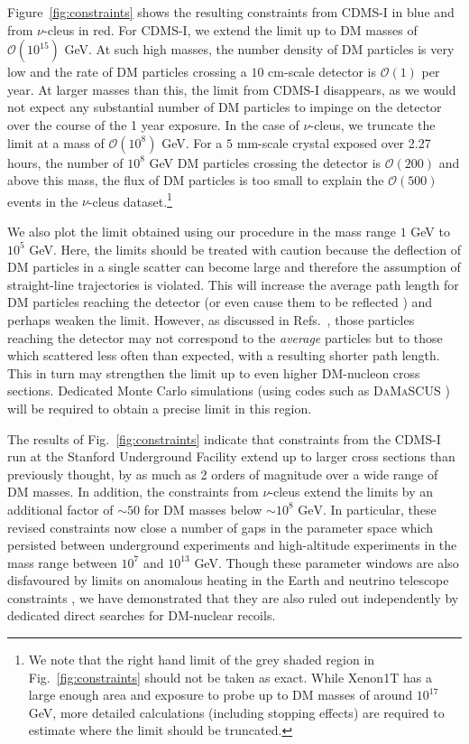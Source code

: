 \documentclass[prd,twocolumn,showpacs,nofootinbib,aps]{revtex4-1}
\begin{document}
Figure~\ref{fig:constraints} shows the resulting constraints from CDMS-I in blue and from $\nu$-cleus in red.  For CDMS-I, we extend the limit up to DM masses of $\mathcal{O}(10^{15})$ GeV. At such high masses, the number density of DM particles is very low and the rate of DM particles crossing a $10 \,\,\mathrm{cm}$-scale detector is $\mathcal{O}(1)$ per year. At larger masses than this, the limit from CDMS-I disappears, as we would not expect any substantial number of DM particles to impinge on the detector over the course of the 1 year exposure. In the case of $\nu$-cleus, we truncate the limit at a mass of $\mathcal{O}(10^{8})$ GeV. For a $5 \,\,\mathrm{mm}$-scale crystal exposed over 2.27 hours, the number of $10^{8}$ GeV DM particles crossing the detector is $\mathcal{O}(200)$ and above this mass, the flux of DM particles is too small to explain the $\mathcal{O}(500)$ events in the $\nu$-cleus dataset.\footnote{We note that the right hand limit of the grey shaded region in Fig.~\ref{fig:constraints} should not be taken as exact. While Xenon1T has a large enough area and exposure to probe up to DM masses  of around $10^{17}$ GeV, more detailed calculations (including stopping effects) are required to estimate where the limit should be truncated.}

We also plot the limit obtained using our procedure in the mass range $1$ GeV to $10^5$ GeV. Here, the limits should be treated with caution because the deflection of DM particles in a single scatter can become large and therefore the assumption of straight-line trajectories is violated. This will increase the average path length for DM particles reaching the detector (or even cause them to be reflected \cite{Kavanagh:2016pyr}) and perhaps weaken the limit. However, as discussed in Refs.~\cite{Mahdawi:2017cxz,Mahdawi:2017utm}, those particles reaching the detector may not correspond to the \textit{average} particles but to those which scattered less often than expected, with a resulting shorter path length. This in turn may strengthen the limit up to even higher DM-nucleon cross sections. Dedicated Monte Carlo simulations (using codes such as \textsc{DaMaSCUS} \cite{Emken2017a, Emken:2017qmp}) will be required to obtain a precise limit in this region.

The results of Fig.~\ref{fig:constraints} indicate that constraints from the CDMS-I run at the Stanford Underground Facility extend up to larger cross sections than previously thought, by as much as 2 orders of magnitude over a wide range of DM masses. In addition, the constraints from $\nu$-cleus extend the limits by an additional factor of $\sim50$ for DM masses below $\sim 10^{8}\,\,\mathrm{GeV}$. In particular, these revised constraints now close a number of gaps in the parameter space which persisted between underground experiments and high-altitude experiments in the mass range between $10^7$ and $10^{13}$ GeV. Though these parameter windows are also disfavoured by limits on anomalous heating in the Earth \cite{Mack:2007xj,Mack2013} and neutrino telescope constraints \cite{Albuquerque:2010bt}, we have demonstrated that they are also ruled out independently by dedicated direct searches for DM-nuclear recoils.
\end{document}
